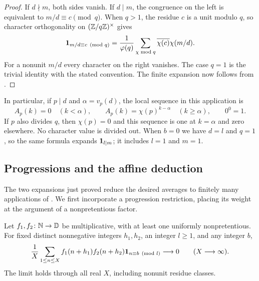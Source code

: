 \begin{proof}
If $d\nmid m$, both sides vanish. If $d\mid m$, the congruence on
the left is equivalent to $m/d\equiv c\pmod q$. When $q>1$, the
residue $c$ is a unit modulo $q$, so character orthogonality on
$(\mathbb Z/q\mathbb Z)^\times$ gives
\[
 \mathbf 1_{m/d\equiv c\pmod q}
 =\frac1{\varphi(q)}\sum_{\chi\bmod q}
       \overline{\chi(c)}\chi(m/d).
\]
For a nonunit $m/d$ every character on the right vanishes. The case
$q=1$ is the trivial identity with the stated convention. The finite
expansion now follows from .
\end{proof}

In particular, if $p\mid d$ and $\alpha=v_p(d)$, the local sequence
in this application is
\[
 A_p(k)=0\quad(k<\alpha),\qquad
 A_p(k)=\chi(p)^{k-\alpha}\quad(k\ge\alpha),
 \qquad 0^0=1.
\]
If $p$ also divides $q$, then $\chi(p)=0$ and this sequence is one
at $k=\alpha$ and zero elsewhere. No character value is divided out.
When $b=0$ we have $d=l$ and $q=1$, so the same formula expands
$\mathbf 1_{l\mid m}$; it includes $l=1$ and $m=1$.

\subsection{Progressions and the affine deduction}

The two expansions just proved reduce the desired averages to finitely
many applications of . We first incorporate a
progression restriction, placing its weight at the argument of a
nonpretentious factor.

\begin{proposition}
\label{prop:affine-progression}
Let $f_1,f_2\colon\mathbb N\to\mathbb D$ be multiplicative, with at least
one uniformly nonpretentious. For fixed distinct nonnegative integers
$h_1,h_2$, an integer $l\ge1$, and any integer $b$,
\begin{equation}
 \frac1X\sum_{1\le n\le X}
 f_1(n+h_1)f_2(n+h_2)\mathbf 1_{n\equiv b\pmod l}
 \longrightarrow0
 \qquad(X\longrightarrow\infty).
 \label{eq:affine-progression-limit}
\end{equation}
The limit holds through all real $X$, including nonunit residue classes.
\end{proposition}

